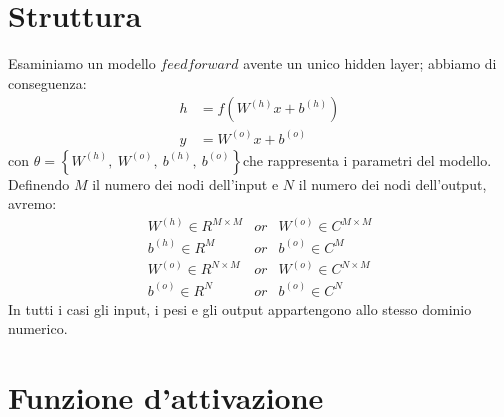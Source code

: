 \documentclass[a4paper,12pt]{report}
\begin{document}
 \section{Struttura}
 Esaminiamo un modello $feedforward$ avente un unico hidden layer; abbiamo di conseguenza:
 \begin{align}
  h &= f\left(W^{\left(h\right)}x+b^{\left(h\right)}\right)\\
  y &= W^{\left(o\right)}x+b^{\left(o\right)}
 \end{align}
 con $\theta = \left \{ W^{\left(h\right)}, \ W^{\left(o\right)}, \ b^{\left(h\right)}, \ b^{\left(o\right)}\right \}$che rappresenta i parametri del modello. Definendo $M$ il numero dei nodi dell'input e $N$ il numero dei nodi dell'output, avremo:
 \begin{equation}
  \begin{matrix}
   W^{\left( h\right) } \in R^{M\times M} & or & W^{\left( o\right) } \in C^{M\times M}\\
   b^{\left( h\right) } \in R^M & or & b^{\left( o\right) } \in C^M\\
   W^{\left( o\right) } \in R^{N\times M} & or & W^{\left( o\right) } \in C^{N\times M}\\
   b^{\left( o\right) } \in R^N & or & b^{\left( o\right) } \in C^N
  \end{matrix}
 \end{equation}
 In tutti i casi gli input, i pesi e gli output appartengono allo stesso dominio numerico.
 
 \section{Funzione d'attivazione}
 
\end{document}
